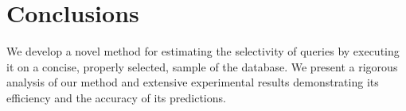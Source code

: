 %
\section{Conclusions}\label{sec:vcfreqcompar}
We develop a novel method for estimating the selectivity of queries by executing
it on a concise, properly selected, sample of the database. We present a
rigorous analysis of our method and extensive experimental results demonstrating
its efficiency and the accuracy of its predictions.


